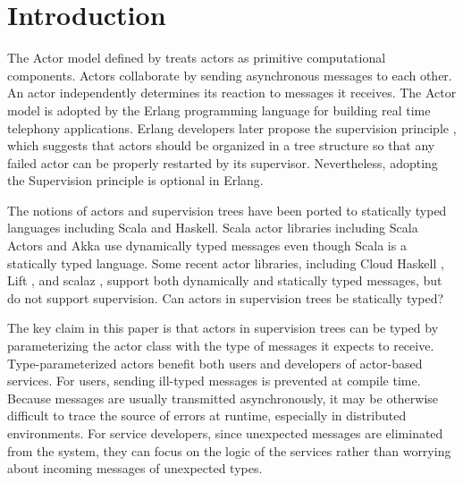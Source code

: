 \section{Introduction}

The Actor model defined by \citet{Hewitt:1973} treats actors as
primitive computational components.  Actors collaborate by sending asynchronous
messages to each other.  An actor independently determines its reaction to
messages it receives.  The Actor model is adopted by the Erlang programming 
language \citep{ArmstrongErlang} for building real time telephony applications. 
Erlang developers later propose the supervision principle \citep{OTP}, which 
suggests that actors should be organized in a tree structure so that any failed 
actor can be properly restarted by its supervisor.  Nevertheless, adopting the 
Supervision principle is optional in Erlang.

The notions of actors and supervision trees have been ported to statically 
typed languages including Scala and Haskell.  Scala actor libraries including 
Scala Actors \citep{actor_1, actor_2} and Akka \citep{akka_api,akka_doc} use 
dynamically typed messages even though Scala is a statically typed language.  
Some recent actor libraries, including Cloud Haskell \citep{CloudHaskell}, Lift 
\citep{lift_scala} , and scalaz \citep{scalaz}, support both 
dynamically and statically typed messages, but do not support supervision.
Can actors in supervision trees be statically typed?

The key claim in this paper is that actors in supervision trees can be
typed by parameterizing the actor class with the type of messages it expects to
receive.  Type-parameterized actors benefit both users and developers
of actor-based services. For users, sending ill-typed messages is prevented at 
compile time.  Because messages are usually transmitted asynchronously, it may 
be otherwise difficult to trace the source of errors at runtime, especially in 
distributed environments.  For service developers, since unexpected messages 
are eliminated from the system, they can focus on the logic of the services 
rather than worrying about incoming messages of unexpected types.  

